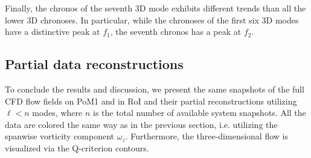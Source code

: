 {{{%

{Finally, the chronos of the seventh 3D mode exhibits different trends than all the lower 3D chronoses. In particular, while the chronoses of the first six 3D modes have a distinctive peak at $f_{1}$, the seventh chronos has a peak at $f_{2}$. 


\subsection{Partial data reconstructions}
\label{sub:partRec}
To conclude the results and discussion, we present the same snapshots of the full CFD flow fields on PoM1 and in RoI and their partial reconstructions utilizing $\ell < n$ modes, where $n$ is the total number of available system snapshots. All the data are colored the same way as in the previous section, i.e. utilizing the spanwise vorticity component $\omega_{z}$. Furthermore, the three-dimensional flow is visualized via the Q-criterion contours.

}}}}
